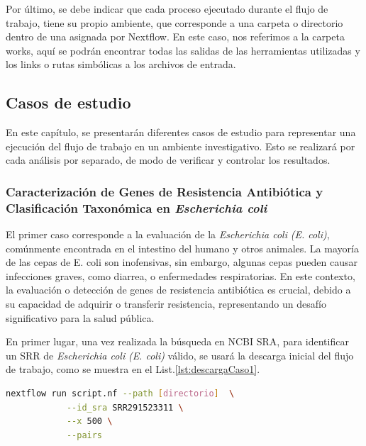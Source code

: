 \documentclass[12pt]{article}
\begin{document}
Por último, se debe indicar que cada proceso ejecutado durante el flujo de trabajo, 
tiene su propio ambiente, que corresponde a una carpeta o directorio dentro de una 
asignada por Nextflow. En este caso, nos referimos a la carpeta works, aquí se podrán 
encontrar todas las salidas de las herramientas utilizadas y los links o rutas 
simbólicas a los archivos de entrada.

\subsection{Casos de estudio}

En este capítulo, se presentarán diferentes casos de estudio para representar una 
ejecución del flujo de trabajo en un ambiente investigativo. Esto se realizará por 
cada análisis por separado, de modo de verificar y controlar los resultados.

\subsubsection*{Caracterización de Genes de Resistencia Antibiótica y Clasificación 
Taxonómica en \textit{Escherichia coli}}

El primer caso corresponde a la evaluación de la 
\textit{Escherichia coli} \emph{(E. coli)}, comúnmente encontrada en el 
intestino del humano y otros animales. La mayoría de las cepas de 
E. coli son inofensivas, sin embargo, algunas cepas pueden causar 
infecciones graves, como diarrea, o enfermedades respiratorias. 
En este contexto, la evaluación o detección de genes de resistencia 
antibiótica es crucial, debido a su capacidad de adquirir o transferir 
resistencia, representando un desafío significativo para la salud 
pública.

En primer lugar, una vez realizada la búsqueda en NCBI SRA, para 
identificar un SRR de \textit{Escherichia coli} \emph{(E. coli)} 
válido, se usará la descarga inicial del flujo de trabajo, 
como se muestra en el List.\ref{lst:descargaCaso1}.

\begin{center}
    \begin{lstlisting}[language=bash, caption=Comando para la descarga inicial de las muestras de \textit{Escherichia coli} \emph{(elaboración propia)}., label=lst:descargaCaso1]
        nextflow run script.nf --path [directorio]  \
            --id_sra SRR291523311 \
            --x 500 \
            --pairs
    \end{lstlisting}
\end{center}
\end{document}
